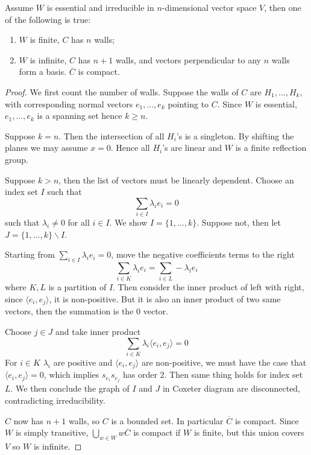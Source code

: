 \documentclass[../main.tex]{subfiles}
\begin{document}
\begin{theorem}\label{thm:indep}
    Assume $W$ is essential and irreducible in $n$-dimensional vector space $V$, then one of the following is true:\begin{enumerate}
        \item $W$ is finite, $C$ has $n$ walls;
        \item $W$ is infinite, $C$ has $n+1$ walls, and vectors perpendicular to any $n$ walls form a basis. $\overline C$ is compact.
    \end{enumerate}
\end{theorem}

\begin{proof}
    We first count the number of walls. Suppose the walls of $C$ are $H_1,\dots,H_k$, with corresponding normal vectors $e_1,\dots,e_k$ pointing to $C$. Since $W$ is essential, $e_1,\dots,e_k$ is a spanning set hence $k\geq n$.

    Suppose $k=n$. Then the intersection of all $H_i$'s is a singleton. By shifting the planes we may assume $x=0$. Hence all $H_i$'s are linear and $W$ is a finite reflection group.

    Suppose $k>n$, then the list of vectors must be linearly dependent. Choose an index set $I$ such that \[
    \sum_{i\in I} \lambda_i e_i=0
    \]
    such that $\lambda_i \neq 0$ for all $i\in I$. We show $I=\{1,\dots,k\}$. Suppose not, then let $J=\{1,\dots,k\}\backslash I$. 

    Starting from $\sum_{i\in I} \lambda_i e_i=0$, move the negative coefficients terms to the right \[
    \sum_{i\in K} \lambda_i e_i=\sum_{i\in L} -\lambda_i e_i
    \] where $K,L$ is a partition of $I$.
    Then consider the inner product of left with right, since $\langle e_i,e_j \rangle$, it is non-positive. But it is also an inner product of two same vectors, then the summation is the $0$ vector.

    Choose $j\in J$ and take inner product \[
    \sum_{i\in K} \lambda_i \langle e_i,e_j\rangle =0
    \]
    For $i\in K$ $\lambda_i$ are positive and $\langle e_i,e_j\rangle$ are non-positive, we must have the case that $\langle e_i,e_j\rangle=0$, which implies $s_{e_i}s_{e_j}$ has order $2$. Then same thing holds for index set $L$. We then conclude the graph of $I$ and $J$ in Coxeter diagram are disconnected, contradicting irreducibility.

    $C$ now has $n+1$ walls, so $C$ is a bounded set. In particular $\overline C$ is compact. Since $W$ is simply transitive, $\bigcup_{w\in W} w\overline C$ is compact if $W$ is finite, but this union covers $V$ so $W$ is infinite.
\end{proof}
\end{document}
